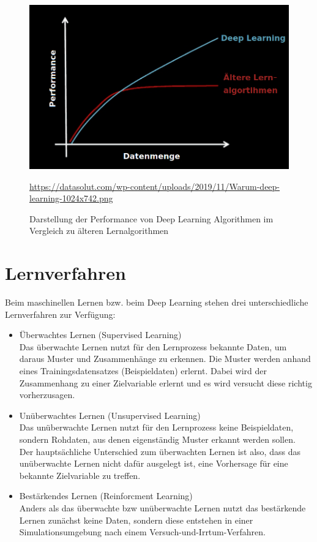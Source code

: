 \begin{figure}[H]
	\centering
	\includegraphics[scale=0.4]{kapitel3/images/Deep_Learning_Performance.png}
	\caption{Darstellung der Performance von Deep Learning Algorithmen im Vergleich zu älteren Lernalgorithmen}
	\label{deep-learning-performance}
	\vspace{0.2cm}
	\quelle\url{https://datasolut.com/wp-content/uploads/2019/11/Warum-deep-learning-1024x742.png}
\end{figure}

\section{Lernverfahren}

Beim maschinellen Lernen bzw. beim Deep Learning stehen drei unterschiedliche Lernverfahren zur Verfügung:

\begin{itemize}
	
	\item Überwachtes Lernen (Supervised Learning)\\
	Das überwachte Lernen nutzt für den Lernprozess bekannte Daten, um daraus Muster und Zusammenhänge zu erkennen. Die Muster werden  anhand eines Trainingsdatensatzes (Beispieldaten) erlernt. Dabei wird der Zusammenhang zu einer Zielvariable erlernt und es wird versucht diese richtig vorherzusagen. \cite{datasolut3}
	
	\item Unüberwachtes Lernen (Unsupervised Learning)\\
	Das unüberwachte Lernen nutzt für den Lernprozess keine Beispieldaten, sondern Rohdaten, aus denen eigenständig Muster erkannt werden sollen. \\
	Der hauptsächliche Unterschied zum überwachten Lernen ist also, dass das unüberwachte Lernen nicht dafür ausgelegt ist, eine Vorhersage für eine bekannte Zielvariable zu treffen. \cite{datasolut3}
	\item Bestärkendes Lernen (Reinforcment Learning)\\
	Anders als das überwachte \acs{bzw} unüberwachte Lernen nutzt das bestärkende Lernen zunächst keine Daten, sondern diese entstehen in einer Simulationsumgebung nach einem Versuch-und-Irrtum-Verfahren. \cite{der-onliner_blogspot}
\end{itemize}

